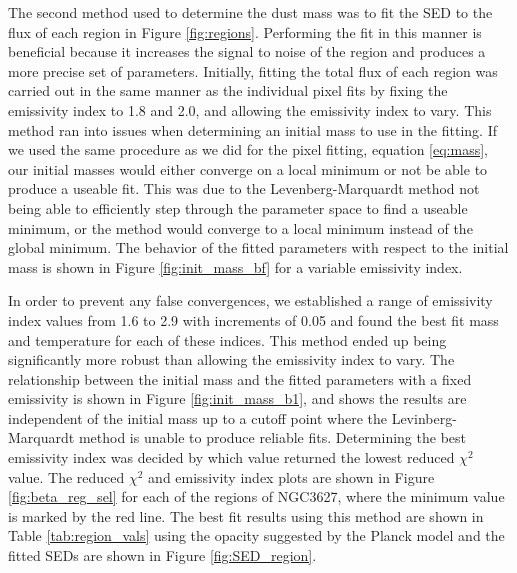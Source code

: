 The second method used to determine the dust mass was to fit the SED to the flux of each region in Figure \ref{fig:regions}.  Performing the fit in this manner is beneficial because it increases the signal to noise of the region and produces a more precise set of parameters.  Initially, fitting the total flux of each region was carried out in the same manner as the individual pixel fits by fixing the emissivity index to 1.8 and 2.0, and allowing the emissivity index to vary.  This method ran into issues when determining an initial mass to use in the fitting.  If we used the same procedure as we did for the pixel fitting, equation \ref{eq:mass}, our initial masses would either converge on a local minimum or not be able to produce a useable fit.  This was due to the Levenberg-Marquardt method not being able to efficiently step through the parameter space to find a useable minimum, or the method would converge to a local minimum instead of the global minimum.  The behavior of the fitted parameters with respect to the initial mass is shown in Figure \ref{fig:init_mass_bf} for a variable emissivity index.  

In order to prevent any false convergences, we established a range of emissivity index values from 1.6 to 2.9 with increments of 0.05 and found the best fit mass and temperature for each of these indices.  This method ended up being significantly more robust than allowing the emissivity index to vary.  The relationship between the initial mass and the fitted parameters with a fixed emissivity is shown in Figure \ref{fig:init_mass_b1}, and shows the results are independent of the initial mass up to a cutoff point where the Levinberg-Marquardt method is unable to produce reliable fits.  Determining the best emissivity index was decided by which value returned the lowest reduced $\chi^2$ value.  The reduced $\chi^2$ and emissivity index plots are shown in Figure \ref{fig:beta_reg_sel} for each of the regions of NGC3627, where the minimum value is marked by the red line.  The best fit results using this method are shown in Table \ref{tab:region_vals} using the opacity suggested by the Planck model and the fitted SEDs are shown in Figure \ref{fig:SED_region}.

